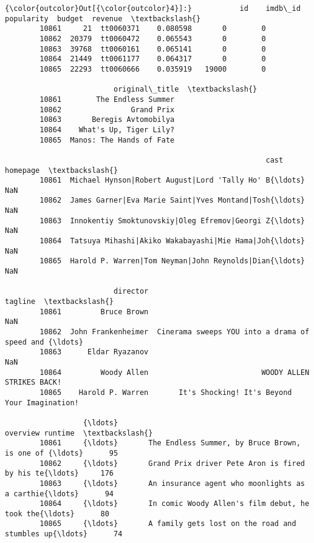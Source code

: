 \documentclass[11pt]{article}
\begin{document}
\begin{Verbatim}[commandchars=\\\{\}]
{\color{outcolor}Out[{\color{outcolor}4}]:}           id    imdb\_id  popularity  budget  revenue  \textbackslash{}
        10861     21  tt0060371    0.080598       0        0   
        10862  20379  tt0060472    0.065543       0        0   
        10863  39768  tt0060161    0.065141       0        0   
        10864  21449  tt0061177    0.064317       0        0   
        10865  22293  tt0060666    0.035919   19000        0   
        
                         original\_title  \textbackslash{}
        10861        The Endless Summer   
        10862                Grand Prix   
        10863       Beregis Avtomobilya   
        10864    What's Up, Tiger Lily?   
        10865  Manos: The Hands of Fate   
        
                                                            cast homepage  \textbackslash{}
        10861  Michael Hynson|Robert August|Lord 'Tally Ho' B{\ldots}      NaN   
        10862  James Garner|Eva Marie Saint|Yves Montand|Tosh{\ldots}      NaN   
        10863  Innokentiy Smoktunovskiy|Oleg Efremov|Georgi Z{\ldots}      NaN   
        10864  Tatsuya Mihashi|Akiko Wakabayashi|Mie Hama|Joh{\ldots}      NaN   
        10865  Harold P. Warren|Tom Neyman|John Reynolds|Dian{\ldots}      NaN   
        
                         director                                            tagline  \textbackslash{}
        10861         Bruce Brown                                                NaN   
        10862  John Frankenheimer  Cinerama sweeps YOU into a drama of speed and {\ldots}   
        10863      Eldar Ryazanov                                                NaN   
        10864         Woody Allen                          WOODY ALLEN STRIKES BACK!   
        10865    Harold P. Warren       It's Shocking! It's Beyond Your Imagination!   
        
                  {\ldots}                                                overview runtime  \textbackslash{}
        10861     {\ldots}       The Endless Summer, by Bruce Brown, is one of {\ldots}      95   
        10862     {\ldots}       Grand Prix driver Pete Aron is fired by his te{\ldots}     176   
        10863     {\ldots}       An insurance agent who moonlights as a carthie{\ldots}      94   
        10864     {\ldots}       In comic Woody Allen's film debut, he took the{\ldots}      80   
        10865     {\ldots}       A family gets lost on the road and stumbles up{\ldots}      74   
        

\end{Verbatim}
\end{document}
